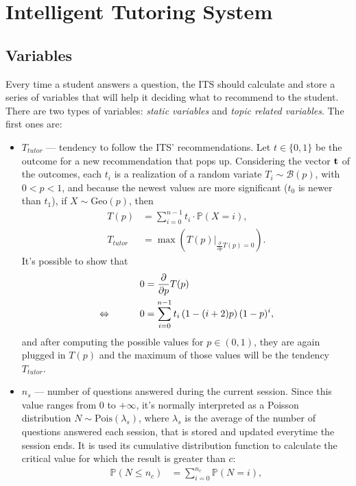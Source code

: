 \documentclass{article}
\newcommand{\0}{\mathbbold{0}}
\newcommand{\1}{\mathds{1}}
\newcommand{\LRA}{\Leftrightarrow\mkern40mu}
\begin{document}
\section{Intelligent Tutoring System}
\lipsum[1]
\subsection{Variables}
Every time a student answers a question, the ITS should calculate and store a series of variables that will help it deciding what to recommend to the student.
There are two types of variables: \textsl{static variables} and \textsl{topic related variables}. The first ones are:
\begin{itemize}
    \item $T_{tutor}$ — tendency to follow the ITS' recommendations. Let $t \in \{0,1\}$ be the outcome for a new recommendation that pops up.
    Considering the vector ${\bf t}$ of the outcomes, each $t_i$ is a realization of a random variate $T_i \sim \mathcal{B}(p)$, with $0 < p < 1$, and because the newest values are more significant ($t_0$ is newer than $t_1$), if $X \sim \text{Geo}(p)$, then
    \begin{align*}
        T(p) &= \sum_{i=0}^{n-1} t_i \cdot \mathbb{P}(X = i), \\
        T_{tutor} &= \max\left(\left.T(p)\right|_{\frac{\partial}{\partial p}T(p) = 0}\right).
    \end{align*}
    It's possible to show that
    \begin{alignat*}{2}
        && 0 &= \frac{\partial}{\partial p}T(p) \\
        \LRA && 0 &= \sum_{i=0}^{n-1} t_i\left(1-(i+2)p\right)(1-p)^i,
    \end{alignat*}
    and after computing the possible values for $p \in (0,1)$, they are again plugged in $T(p)$ and the maximum of those values will be the tendency $T_{tutor}$.
    \item $n_s$ — number of questions answered during the current session. Since this value ranges from $0$ to $+\infty$, it's normally interpreted as a Poisson distribution $N \sim \text{Pois}(\lambda_s)$, where $\lambda_s$ is the average of the number of questions answered each session, that is stored and updated everytime the session ends.
    It is used its cumulative distribution function to calculate the critical value for which the result is greater than $c$:
    \begin{align*}
        \mathbb{P}(N \le n_c) &= \sum_{i=0}^{n_c} \mathbb{P}(N = i), \\

\end{align*}
\end{itemize}
\end{document}
